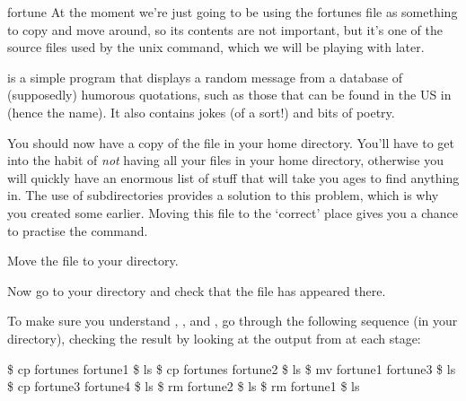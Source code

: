 \begin{linux}{fortune}
  \label{breakbox:fortune}
  At the moment we're just going to be using the fortunes file as something to copy and move around, so its contents are not important, but it's one of the source files used by the unix  command, which we will be playing with later.

   is a simple program that displays a random message from a database of (supposedly) humorous quotations, such as those that can be found in the US in  (hence the name). It also contains jokes (of a sort!) and bits of poetry.

\end{linux}

You should now have a copy of the file in your home directory.
You'll have to get into the habit of \emph{not} having all your files
in your home directory, otherwise you will quickly have an enormous list
of stuff that will take you ages to find anything in. The use of subdirectories
provides a solution to this problem, which is why you created some
earlier. Moving this file to the `correct' place gives you a chance
to practise the  command.

Move the file  to your  directory.


Now go to your  directory and check that the file
has appeared there.

To make sure you understand , , and
, go through the following sequence (in your
 directory), checking the result by looking at the
output from  at each stage:

\begin{ttoutenv}
\$  cp fortunes fortune1 \return
\$  ls \return
\$  cp fortunes fortune2 \return
\$  ls \return
\$  mv fortune1 fortune3 \return
\$  ls \return
\$  cp fortune3 fortune4 \return
\$  ls \return
\$  rm fortune2 \return
\$  ls \return
\$  rm fortune1 \return
\$  ls \return
\end{ttoutenv}



